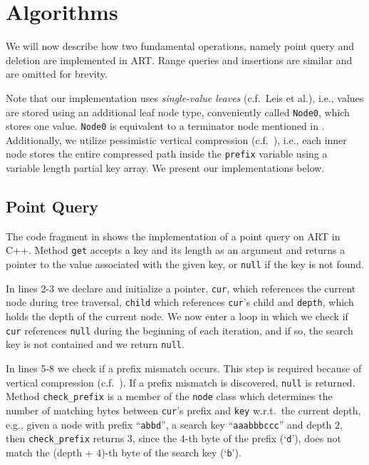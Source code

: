 \documentclass[abstracton,12pt]{scrartcl}
\theoremstyle{definition}
\begin{document}
\newpage

\section{Algorithms}\label{sec:algorithms}

\vspace{-2mm}
We will now describe how two fundamental operations, namely
point query and deletion are implemented in ART.
Range queries and insertions are similar and are omitted for brevity.

Note that our implementation uses
\textit{single-value leaves} (c.f.\ Leis et al.), 
i.e., values are stored using an additional leaf node type, conveniently
called \texttt{Node0}, which stores one value. \texttt{Node0} is equivalent to
a terminator node mentioned in . Additionally, we utilize
pessimistic vertical compression (c.f.\ ),
i.e., each inner node stores the entire compressed path inside the 
\texttt{prefix} variable using a variable length partial key array. 
We present our implementations below.

\vspace{-4mm}
\subsection{Point Query}\label{sec:point-query}

\vspace{-1mm}
The code fragment in  shows the implementation of a 
point query on ART in C++. Method \texttt{get} accepts a key and its length
as an argument and returns a pointer to the value associated with the given 
key, or \texttt{null} if the key is not found.

In lines 2-3 we declare and initialize a pointer, \texttt{cur}, which references
the current node during tree traversal, \texttt{child} which references 
\texttt{cur}'s child and \texttt{depth}, which holds the depth
of the current node. We now enter a loop in which we check if \texttt{cur} 
references \texttt{null} during the beginning of each iteration, and if so, 
the search key is not contained and we return \texttt{null}.

In lines 5-8 we check if a prefix mismatch occurs. This step is required
because of vertical compression (c.f.\ ).
If a prefix mismatch is discovered, \texttt{null} is returned. Method 
\texttt{check\_prefix} is a member of the \texttt{node} class which
determines the number of matching bytes between \texttt{cur}'s prefix
and \texttt{key} w.r.t.\ the current depth, e.g., given a node with prefix
``\texttt{abbd}'', a search key ``\texttt{aaabbbccc}'' and depth $2$, then
\texttt{check\_prefix} returns $3$, since the $4$-th byte of the prefix
(`\texttt{d}'), does not match the (depth + $4$)-th byte of the search key
(`\texttt{b}').
\end{document}
